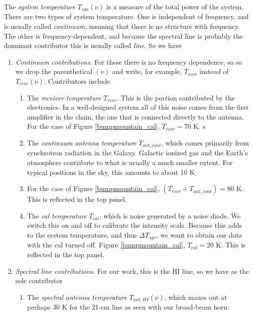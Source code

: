 \documentclass[preprint]{aastex}
\begin{document}
	The {\it system temperature} $T_{sys}(\nu)$ is a measure of the
total power of the system. There are two types of system temperature.
One is independent of frequency, and is usually called {\it continuum},
meaning that there is no structure with frequency. The other is
frequency-dependent, and because the spectral line is probably the
dominant contributor this is usually called {\it line}. So we have
\begin{enumerate}

	\item {\it Continuum contributions}. For these there is no
frequency dependence, so so we drop the parenthetical $(\nu )$ and
write, for example, $T_{rcvr}$ instead of $T_{rcvr}(\nu)$. Contributors
include \begin{enumerate}

	\item The {\it receiver temperature} $T_{rcvr}$. This is the
portion contributed by the electronics. In a well-designed system all of
this noise comes from the first amplifier in the chain, the one that is
connected directly to the antenna. For the case of Figure
\ref{bumpmountain_cal}, $T_{rcvr} \sim 70$ K.
s
	\item The {\it continuum antenna temperature} $T_{ant, cont}$,
which comes primarily from synchrotron radiation in the Galaxy. Galactic
ionized gas and the Earth's atmosphere contribute to what is usually a much
smaller extent. For typical positions in the sky, this amounts to about
10 K. 

\item For the case of Figure \ref{bumpmountain_cal}, $(T_{rcvr} + T_{ant,
  cont}) = 80$ K. This is reflected in the top panel. 

	\item The {\it cal temperature} $T_{cal}$, which is noise
generated by a noise diode. We switch this on and off to calibrate the
intensity scale. Because this adds to the system temperature, and thus
$\Delta T_{sys}$, we want to obtain our data with the cal turned off.
Figure \ref{bumpmountain_cal}, $T_{cal} = 20$ K. This is reflected in
the top panel.

\end{enumerate}

\item {\it Spectral line contributions}. For our work, this is the HI
line, so we have as the sole contributor \begin{enumerate}

	\item The {\it spectral antenna temperature} $T_{ant, HI}(\nu)$,
which maxes out at perhaps 30 K for the 21-cm line as seen with our
broad-beam horn.

\end{enumerate}
\end{enumerate}
\end{document}
